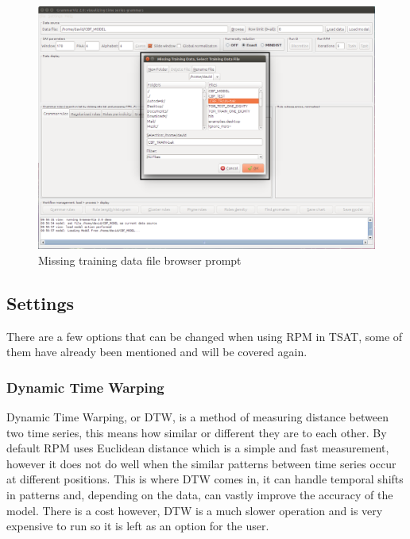 \documentclass[letterpaper, 12pt]{article}
\begin{document}
\begin{figure}[H]
	\includegraphics[width=\textwidth]{TSAT-load-model-failed-data}
	\caption{Missing training data file browser prompt}
	\label{fig:TSAT-load-model-failed-data}
\end{figure}

\subsection{Settings}
\label{RPMSettings}
There are a few options that can be changed when using RPM in TSAT, some of them have already been mentioned and will be covered again.

\subsubsection{Dynamic Time Warping}
Dynamic Time Warping, or DTW, is a method of measuring distance between two time series, this means how similar or different they are to each other. By default RPM uses Euclidean distance which is a simple and fast measurement, however it does not do well when the similar patterns between time series occur at different positions. This is where DTW comes in, it can handle temporal shifts in patterns and, depending on the data, can vastly improve the accuracy of the model. There is a cost however, DTW is a much slower operation and is very expensive to run so it is left as an option for the user. 
\end{document}
